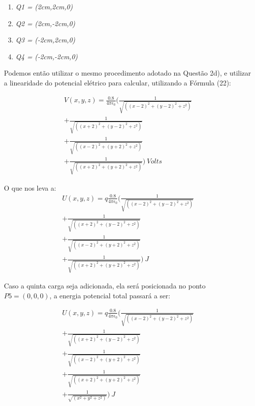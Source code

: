 \documentclass[journal,comsoc]{IEEEtran}
\begin{document}
\begin{enumerate}
	\item{\textit{Q1 = (2cm,2cm,0)}}
    \item{\textit{Q2 = (2cm,-2cm,0)}}
    \item{\textit{Q3 = (-2cm,2cm,0)}}
    \item{\textit{Q4 = (-2cm,-2cm,0)}}
\end{enumerate}
\hfill

\par Podemos então utilizar o mesmo procedimento adotado na Questão 2d), e utilizar a linearidade do potencial elétrico para calcular, utilizando a Fórmula (22):

\begin{equation}
\begin{aligned}
    	V(x,y,z) = \frac{0.8}{4\pi{\epsilon}_{0}}
        \Big(
        \frac
        {1} 
        {\sqrt{((x-2)^2+(y-2)^2+z^2)}}
        \\
       +\frac
        {1} 
        {\sqrt{((x+2)^2+(y-2)^2+z^2)}}
        \\
       +\frac
        {1} 
        {\sqrt{((x-2)^2+(y+2)^2+z^2)}}
        \\
       +\frac
        {1} 
        {\sqrt{((x+2)^2+(y+2)^2+z^2)}}
        \Big)\ Volts
\end{aligned}
\end{equation}
\par O que nos leva a:
\begin{equation}
\begin{aligned}
    	U(x,y,z) = q\frac{0.8}{4\pi{\epsilon}_{0}}
        \Big(
        \frac
        {1} 
        {\sqrt{((x-2)^2+(y-2)^2+z^2)}}
        \\
       +\frac
        {1} 
        {\sqrt{((x+2)^2+(y-2)^2+z^2)}}
        \\
       +\frac
        {1} 
        {\sqrt{((x-2)^2+(y+2)^2+z^2)}}
        \\
       +\frac
        {1} 
        {\sqrt{((x+2)^2+(y+2)^2+z^2)}}
        \Big)\ J
\end{aligned}
\end{equation}

\par Caso a quinta carga seja adicionada, ela será posicionada no ponto $P5 = (0,0,0)$, a energia potencial total passará a ser: 

\begin{equation}
\begin{aligned}
    	U(x,y,z) = q\frac{0.8}{4\pi{\epsilon}_{0}}
        \Big(
        \frac
        {1} 
        {\sqrt{((x-2)^2+(y-2)^2+z^2)}}
        \\
       +\frac
        {1} 
        {\sqrt{((x+2)^2+(y-2)^2+z^2)}}
        \\
       +\frac
        {1} 
        {\sqrt{((x-2)^2+(y+2)^2+z^2)}}
        \\
       +\frac
        {1} 
        {\sqrt{((x+2)^2+(y+2)^2+z^2)}}
        \\
       +\frac
        {1} 
        {\sqrt{(x^2+y^2+z^2)}}
        \Big)\ J
\end{aligned}
\end{equation}
\end{document}
